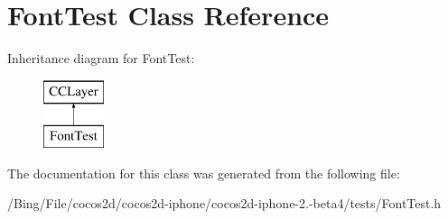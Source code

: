 \hypertarget{interface_font_test}{\section{Font\-Test Class Reference}
\label{interface_font_test}
}
Inheritance diagram for Font\-Test\-:\begin{figure}[H]
\begin{center}
\leavevmode
\includegraphics[height=2.000000cm]{interface_font_test}
\end{center}
\end{figure}


The documentation for this class was generated from the following file\-:\begin{DoxyCompactItemize}
\item 
/\-Bing/\-File/cocos2d/cocos2d-\/iphone/cocos2d-\/iphone-\/2.-\/beta4/tests/Font\-Test.\-h\end{DoxyCompactItemize}
